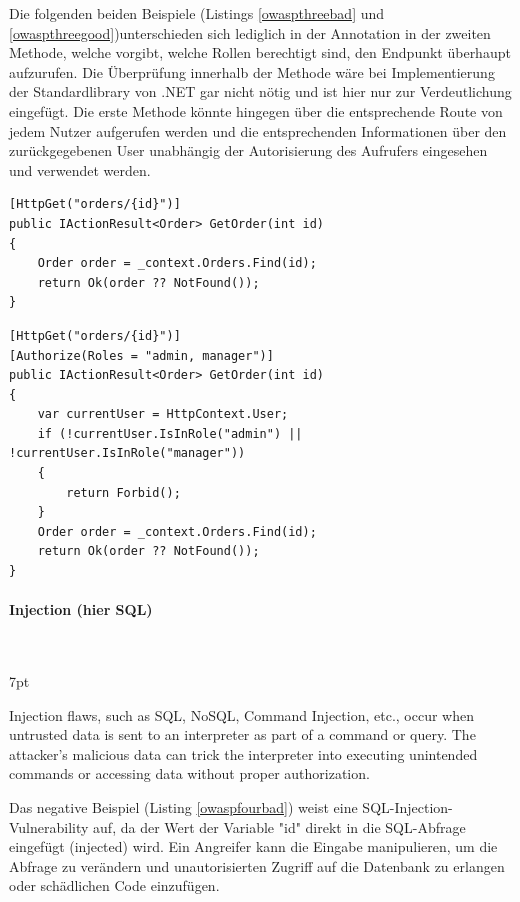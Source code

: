 \documentclass[notitlepage, hidelinks]{article}
\newenvironment{formal}{%
  \def\FrameCommand{%
    \hspace{1pt}%
    {\color{black}\vrule width 2pt}%
    {\color{formalshade}\vrule width 4pt}%
    \colorbox{formalshade}%
  }%
  \MakeFramed{\advance\hsize-\width\FrameRestore}%
  \noindent\hspace{-4.55pt}%
  \begin{adjustwidth}{}{7pt}%
  \vspace{2pt}\vspace{2pt}%
}
{%
  \vspace{2pt}\end{adjustwidth}\endMakeFramed%
}
\begin{document}
Die folgenden beiden Beispiele (Listings \ref{owaspthreebad} und \ref{owaspthreegood})unterschieden sich lediglich in der Annotation in der zweiten Methode, welche vorgibt, welche Rollen berechtigt sind, den Endpunkt überhaupt aufzurufen. Die Überprüfung innerhalb der Methode wäre bei Implementierung der Standardlibrary von .NET gar nicht nötig und ist hier nur zur Verdeutlichung eingefügt. Die erste Methode könnte hingegen über die entsprechende Route von jedem Nutzer aufgerufen werden und die entsprechenden Informationen über den zurückgegebenen User unabhängig der Autorisierung des Aufrufers eingesehen und verwendet werden.

\begin{lstlisting}[language={[Sharp]C},frame=single,caption=Negativbeispiel Broken Function Level Authorization,label=owaspthreebad]
[HttpGet("orders/{id}")]
public IActionResult<Order> GetOrder(int id)
{
    Order order = _context.Orders.Find(id);
    return Ok(order ?? NotFound());    
}
\end{lstlisting}


\begin{lstlisting}[language={[Sharp]C},frame=single,caption=Positivbeispiel Broken Function Level Authorization,label=owaspthreegood]
[HttpGet("orders/{id}")]
[Authorize(Roles = "admin, manager")]
public IActionResult<Order> GetOrder(int id)
{
    var currentUser = HttpContext.User;
    if (!currentUser.IsInRole("admin") || !currentUser.IsInRole("manager"))
    {
        return Forbid();
    }
    Order order = _context.Orders.Find(id);
    return Ok(order ?? NotFound());
}
\end{lstlisting}


\paragraph{Injection (hier SQL)} \mbox{} \\
\begin{formal}
Injection flaws, such as SQL, NoSQL, Command Injection, etc., occur when untrusted data is sent to an interpreter as part of a command or query. The attacker's malicious data can trick the interpreter into executing unintended commands or accessing data without proper authorization.
\end{formal}

Das negative Beispiel (Listing \ref{owaspfourbad}) weist eine SQL-Injection-Vulnerability auf, da der Wert der Variable "id" direkt in die SQL-Abfrage eingefügt (injected) wird. Ein Angreifer kann die Eingabe manipulieren, um die Abfrage zu verändern und unautorisierten Zugriff auf die Datenbank zu erlangen oder schädlichen Code einzufügen.
\end{document}
